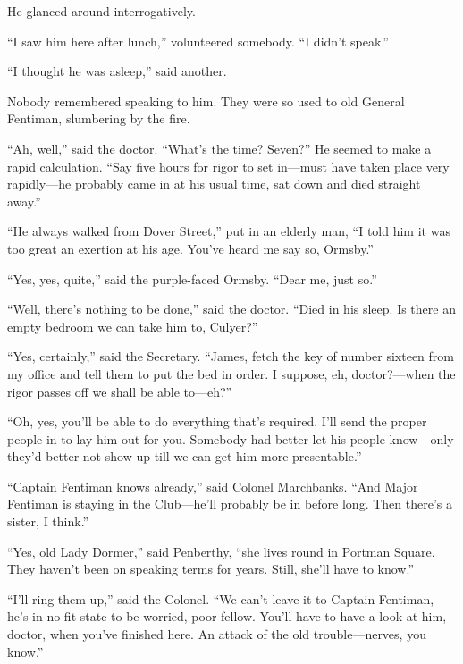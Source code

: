 He glanced around interrogatively.

\enquote{I saw him here after lunch,} volunteered somebody. \enquote{I didn't speak.}

\enquote{I thought he was asleep,} said another.

Nobody remembered speaking to him. They were so used to old General Fentiman, slumbering by the fire.

\enquote{Ah, well,} said the doctor. \enquote{What's the time? Seven?} He seemed to make a rapid calculation. \enquote{Say five hours for rigor to set in\allowbreak---\allowbreak must have taken place very rapidly\allowbreak---\allowbreak he probably came in at his usual time, sat down and died straight away.}

\enquote{He always walked from Dover Street,} put in an elderly man, \enquote{I told him it was too great an exertion at his age. You've heard me say so, Ormsby.}

\enquote{Yes, yes, quite,} said the purple-faced Ormsby. \enquote{Dear me, just so.}

\enquote{Well, there's nothing to be done,} said the doctor. \enquote{Died in his sleep. Is there an empty bedroom we can take him to, Culyer?}

\enquote{Yes, certainly,} said the Secretary. \enquote{James, fetch the key of number sixteen from my office and tell them to put the bed in order. I suppose, eh, doctor?---when the rigor passes off we shall be able to\allowbreak---\allowbreak eh?}

\enquote{Oh, yes, you'll be able to do everything that's required. I'll send the proper people in to lay him out for you. Somebody had better let his people know\allowbreak---\allowbreak only they'd better not show up till we can get him more presentable.}

\enquote{Captain Fentiman knows already,} said Colonel Marchbanks. \enquote{And Major Fentiman is staying in the Club\allowbreak---\allowbreak he'll probably be in before long. Then there's a sister, I think.}

\enquote{Yes, old Lady Dormer,} said Penberthy, \enquote{she lives round in Portman Square. They haven't been on speaking terms for years. Still, she'll have to know.}

\enquote{I'll ring them up,} said the Colonel. \enquote{We can't leave it to Captain Fentiman, he's in no fit state to be worried, poor fellow. You'll have to have a look at him, doctor, when you've finished here. An attack of the old trouble\allowbreak---\allowbreak nerves, you know.}

